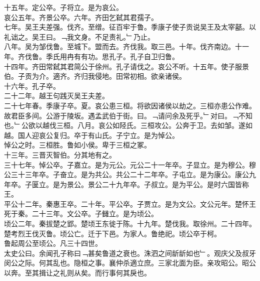 \documentclass{zhvt-classic}
\begin{document}
\hspace*{2em}十五年。定公卒。子将立。是为哀公。\\
\hspace*{2em}哀公五年。齐景公卒。六年。齐田乞弑其君孺子。\\
\hspace*{2em}七年。吴王夫差强。伐齐。至缯。征百牢于鲁。季康子使子贡说吴王及太宰嚭。以礼诎之。吴王曰。﹁我文身。不足责礼。﹂乃止。\\
\hspace*{2em}八年。吴为邹伐鲁。至城下。盟而去。齐伐我。取三邑。十年。伐齐南边。十一年。齐伐鲁。季氏用冉有有功。思孔子。孔子自卫归鲁。\\
\hspace*{2em}十四年。齐田常弑其君简公于俆州。孔子请伐之。哀公不听。十五年。使子服景伯。子贡为介。適齐。齐归我侵地。田常初相。欲亲诸侯。\\
\hspace*{2em}十六年。孔子卒。\\
\hspace*{2em}二十二年。越王句践灭吴王夫差。\\
\hspace*{2em}二十七年春。季康子卒。夏。哀公患三桓。将欲因诸侯以劫之。三桓亦患公作难。故君臣多间。公游于陵坂。遇孟武伯于街。曰。﹁请问余及死乎。﹂对曰。﹁不知也。﹂公欲以越伐三桓。八月。哀公如陉氏。三桓攻公。公奔于卫。去如邹。遂如越。国人迎哀公复归。卒于有山氏。子宁立。是为悼公。\\
\hspace*{2em}悼公之时。三桓胜。鲁如小侯。卑于三桓之冢。\\
\hspace*{2em}十三年。三晋灭智伯。分其地有之。\\
\hspace*{2em}三十七年。悼公卒。子嘉立。是为元公。元公二十一年卒。子显立。是为穆公。穆公三十三年卒。子奋立。是为共公。共公二十二年卒。子屯立。是为康公。康公九年卒。子匽立。是为景公。景公二十九年卒。子叔立。是为平公。是时六国皆称王。\\
\hspace*{2em}平公十二年。秦惠王卒。二十年。平公卒。子贾立。是为文公。文公元年。楚怀王死于秦。二十三年。文公卒。子雠立。是为顷公。\\
\hspace*{2em}顷公二年。秦拔楚之郢。楚顷王东徙于陈。十九年。楚伐我。取徐州。二十四年。楚考烈王伐灭鲁。顷公亡。迁于下邑。为家人。鲁绝祀。顷公卒于柯。\\
\hspace*{2em}鲁起周公至顷公。凡三十四世。\\
\hspace*{2em}太史公曰。余闻孔子称曰﹁甚矣鲁道之衰也。洙泗之间龂龂如也﹂。观庆父及叔牙闵公之际。何其乱也。隐桓之事。襄仲杀適立庶。三家北面为臣。亲攻昭公。昭公以奔。至其揖让之礼则从矣。而行事何其戾也。\\
\end{document}
